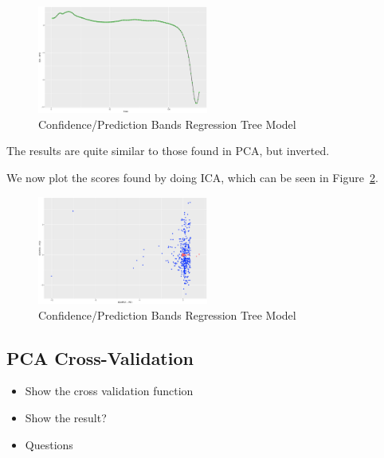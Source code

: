 \documentclass[a4paper, twocolumn]{article}
\begin{document}
        \begin{figure}[h!]
            \centering
            \caption{Confidence/Prediction Bands Regression Tree Model}
            \label{fig:x752ical}
            \includegraphics[width=0.5\textwidth]{share/A2_trace_ICA2.eps}
        \end{figure}

        The results are quite similar to those found in PCA, but inverted.

        We now plot the scores found by doing ICA, which can be seen in Figure~\ref{fig:icascores}.

        \begin{figure}[h!]
            \centering
            \caption{Confidence/Prediction Bands Regression Tree Model}
            \label{fig:icascores}
            \includegraphics[width=0.5\textwidth]{share/A2_icascore.eps}
        \end{figure}

    \subsection*{PCA Cross-Validation}

        \begin{itemize}
            \item Show the cross validation function
            \item Show the result?
            \item Questions
        \end{itemize}
\end{document}
